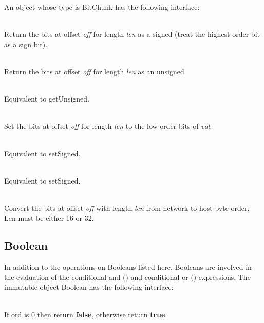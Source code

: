 An object whose type is BitChunk has the following interface:

\begin{desc}
  \item[\kw{function}  getSigned\/\LB{}off\CO{} \tn{Integer}, len\CO{} \tn{Integer}\/\RB{} \returns{} \/\LB{}\tn{Integer}\/\RB{}]~\\
    Return the bits at offset {\it off} for length {\it len} as a signed
     (treat the highest order bit as a sign bit).
  \item[\kw{function}  getUnsigned\/\LB{}off \CO{} \tn{Integer}, len \CO{} \tn{Integer}\/\RB{} \returns{} \/\LB{}\tn{Integer}\/\RB{}]~\\
    Return the bits at offset {\it off} for length {\it len} as an unsigned 
  \item[\kw{function}  getElement\/\LB{}\tn{Integer}, \tn{Integer}\/\RB{} \returns{} \/\LB{}\tn{Integer}\/\RB{}]~\\
    Equivalent to getUnsigned.
  \item[\kw{operation} setSigned\/\LB{}off\CO{}\tn{Integer}, len\CO{}\tn{Integer}, val\CO{}\tn{Integer}\/\RB{}]~\\
    Set the bits at offset {\it off} for length {\it len} to the low order bits of {\it val}.
  \item[\kw{operation} setUnsigned\/\LB{}\tn{Integer}, \tn{Integer}, \tn{Integer}\/\RB{}]~\\
    Equivalent to setSigned.
  \item[\kw{operation} setElement\/\LB{}\tn{Integer}, \tn{Integer}, \tn{Integer}\/\RB{}]~\\
    Equivalent to setSigned.
  \item[\kw{operation} ntoh\/\LB{}off \CO{} \tn{Integer}, len \CO{} \tn{Integer}\/\RB{}]~\\
    Convert the bits at offset {\it off} with length {\it len} from network to host
    byte order.  Len must be either 16 or 32.
\end{desc}

\subsection{Boolean}
\label{builtin Boolean}
In addition to the operations on Booleans listed here, Booleans are
involved in the evaluation of the conditional and () and
conditional or () expressions.
The immutable object Boolean has the following interface:

\begin{desc}
  \item[\kw{function} create\/\LB{}ord \CO{} \tn{Integer}\/\RB{} \returns{} \/\LB{}\tn{Boolean}\/\RB{}]~\\
    If ord is 0 then return {\bf false}, otherwise return {\bf true}.
\end{desc}

